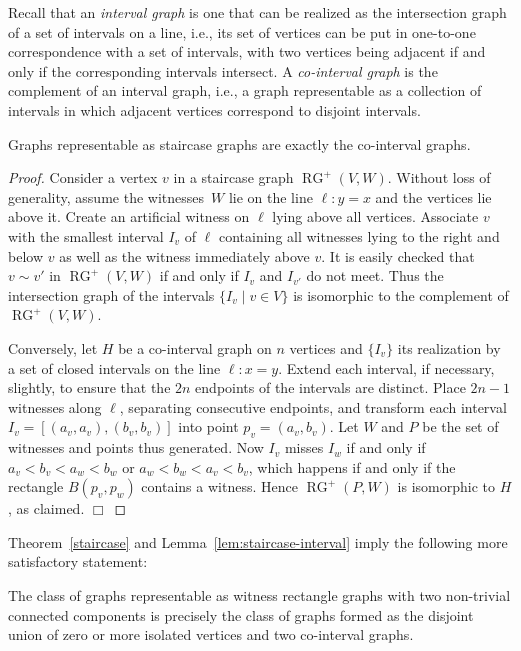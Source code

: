 \documentclass{llncs}
\DeclareMathOperator{\RG}{RG} \DeclareMathOperator{\RIG}{RIG} \DeclareMathOperator{\MNG}{MNG} \DeclareMathOperator{\GG}{GG} \DeclareMathOperator{\DG}{DG} \DeclareMathOperator{\WRG}{WRG}
\begin{document}
Recall that an \emph{interval graph} is one that can be realized as
the intersection graph of a set of intervals on a line, i.e., its set
of vertices can be put in one-to-one correspondence with a set of
intervals, with two vertices being adjacent if and only if the
corresponding intervals intersect.  A \emph{co-interval graph} is the
complement of an interval graph, i.e., a graph representable as a
collection of intervals in which adjacent vertices correspond to
disjoint intervals.

\begin{lemma}
  \label{lem:staircase-interval}
  Graphs representable as staircase graphs are exactly the co-interval
  graphs.
\end{lemma}

\begin{proof}
  Consider a vertex $v$ in a staircase graph $\RG^+(V,W)$.  Without
  loss of generality, assume the witnesses~$W$ lie on the line $\ell
  \colon y=x$ and the vertices lie above it.  Create an artificial witness on $\ell$ lying above all
  vertices.  Associate $v$ with the smallest interval $I_v$ of $\ell$
  containing all witnesses lying to the right and below $v$ as well as
  the witness immediately above $v$.  It is easily checked that $v
  \sim v'$ in $\RG^+(V,W)$ if and only if $I_v$ and $I_{v'}$ do not
  meet.  Thus the intersection graph of the intervals $\{ I_v \mid v
  \in V\}$ is isomorphic to the complement of $\RG^+(V,W)$.

  Conversely, let $H$ be a co-interval graph on $n$ vertices and
$\{I_v\}$ its realization by a set of closed intervals on the
  line $\ell \colon x=y$.  Extend each interval, if necessary,
  slightly, to ensure that the $2n$ endpoints of the intervals are
  distinct.  Place $2n-1$ witnesses along $\ell$, separating
  consecutive endpoints, and transform each interval
  $I_v=[(a_v,a_v),(b_v,b_v)]$ into point $p_v=(a_v,b_v)$.  Let $W$ and
  $P$ be the set of witnesses and points thus generated.  Now $I_v$
  misses $I_w$ if and only if $a_v < b_v < a_w < b_w$ or $a_w < b_w <
  a_v < b_v$, which happens if and only if the rectangle
  $B(p_v,p_w)$ contains a witness.  Hence $\RG^+(P,W)$ is isomorphic
  to $H$, as claimed.  \hfill $\Box$
\end{proof}

Theorem~\ref{staircase} and Lemma~\ref{lem:staircase-interval} imply
the following more satisfactory statement:
\begin{theorem}
  \label{thm:staircase-two-intervals}
  The class of graphs representable as witness rectangle graphs with
  two non-trivial connected components is precisely the class of
  graphs formed as the disjoint union of zero or more isolated vertices
  and two co-interval graphs.
\end{theorem}
\end{document}
